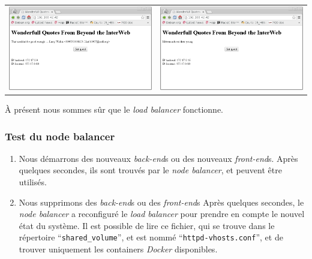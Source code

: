 \documentclass[a4paper,11pt,titlepage]{article}
\begin{document}
\begin{center}
\begin{tabular}{cc}
	\includegraphics[scale=0.3]{test4.png} & \includegraphics[scale=0.3]{test5.png} \\
\end{tabular}
\end{center}

À présent nous sommes sûr que le \emph{load balancer} fonctionne.

\subsubsection{Test du node balancer}
\begin{enumerate}
	\item Nous démarrons des nouveaux \emph{back-end}s ou des nouveaux \emph{front-end}s.
Après quelques secondes, ils sont trouvés par le \emph{node balancer}, et peuvent être utilisés.
	\item Nous supprimons des \emph{back-end}s ou des \emph{front-end}s
Après quelques secondes, le \emph{node balancer} a reconfiguré le \emph{load balancer} pour prendre en compte le nouvel état du système.
Il est possible de lire ce fichier, qui se trouve dans le répertoire ``\texttt{shared\_volume}'', et est nommé ``\texttt{httpd-vhosts.conf}'',
et de trouver uniquement les containers \emph{Docker} disponibles.
\end{enumerate}
\end{document}

